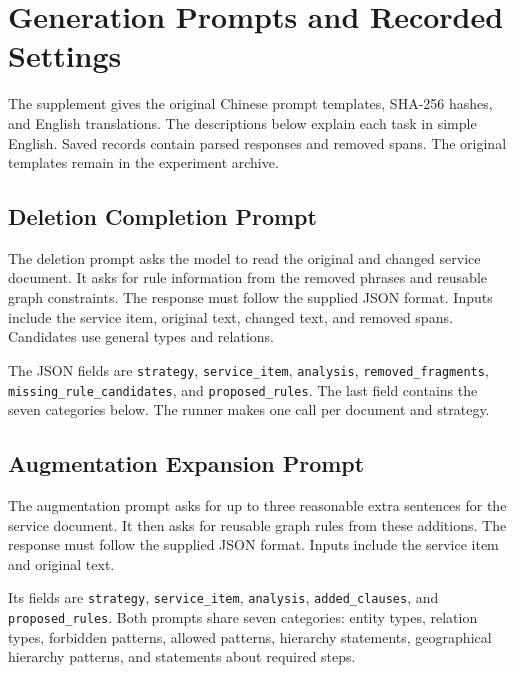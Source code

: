 \appendices

\section{Generation Prompts and Recorded Settings}

\label{app:prompts}

The supplement gives the original Chinese prompt templates, SHA-256 hashes,
and English translations. The descriptions below explain each task in
simple English. Saved records contain parsed responses and removed spans.
The original templates remain in the experiment archive.

\subsection{Deletion Completion Prompt}

\label{app:prompt_deletion}

The deletion prompt asks the model to read the original and changed
service document. It asks for rule information from the removed phrases
and reusable graph constraints. The response must follow the supplied
JSON format. Inputs include the service item, original text, changed text,
and removed spans. Candidates use general types and relations.

The JSON fields are \texttt{strategy}, \texttt{service\_item},
\texttt{analysis}, \texttt{removed\_fragments},
\texttt{missing\_rule\_candidates}, and \texttt{proposed\_rules}.
The last field contains the seven categories below.
The runner makes one call per document and strategy.

\subsection{Augmentation Expansion Prompt}

\label{app:prompt_augmentation}

The augmentation prompt asks for up to three reasonable extra sentences
for the service document. It then asks for reusable graph rules from
these additions. The response must follow the supplied JSON format.
Inputs include the service item and original text.

Its fields are \texttt{strategy}, \texttt{service\_item}, \texttt{analysis},
\texttt{added\_clauses}, and \texttt{proposed\_rules}.
Both prompts share seven categories: entity types, relation types,
forbidden patterns, allowed patterns, hierarchy statements,
geographical hierarchy patterns, and statements about required steps.

